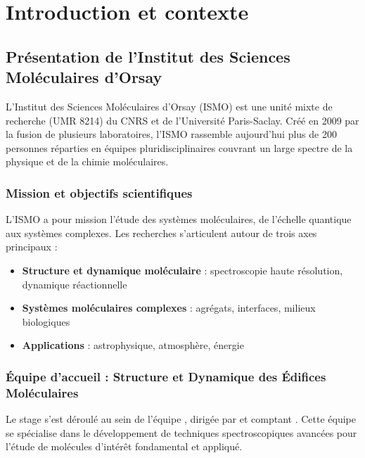 
\chapter{Introduction et contexte}
\label{chap:introduction}


\section{Présentation de l'Institut des Sciences Moléculaires d'Orsay}

L'Institut des Sciences Moléculaires d'Orsay (ISMO) est une unité mixte de recherche (UMR 8214) du CNRS et de l'Université Paris-Saclay. Créé en 2009 par la fusion de plusieurs laboratoires, l'ISMO rassemble aujourd'hui plus de 200 personnes réparties en équipes pluridisciplinaires couvrant un large spectre de la physique et de la chimie moléculaires.

\subsection{Mission et objectifs scientifiques}

L'ISMO a pour mission l'étude des systèmes moléculaires, de l'échelle quantique aux systèmes complexes. Les recherches s'articulent autour de trois axes principaux :
\begin{itemize}
    \item \textbf{Structure et dynamique moléculaire} : spectroscopie haute résolution, dynamique réactionnelle
    \item \textbf{Systèmes moléculaires complexes} : agrégats, interfaces, milieux biologiques
    \item \textbf{Applications} : astrophysique, atmosphère, énergie
\end{itemize}

\subsection{Équipe d'accueil : Structure et Dynamique des Édifices Moléculaires}

Le stage s'est déroulé au sein de l'équipe \researchteam, dirigée par \teamleader et comptant \teamsize. Cette équipe se spécialise dans le développement de techniques spectroscopiques avancées pour l'étude de molécules d'intérêt fondamental et appliqué.

